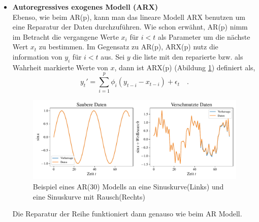 \begin{itemize}
\[\begin{matrix}
    \end{matrix}\right)
  \]
  und \[
  \phi=
    \left(\begin{matrix}
    \phi_{1}\\
    \phi_{2}\\
    \vdots\\
    \phi_{p-1}\\
    \phi_{p}
    \end{matrix}\right)
  \]
  Um eine Reparation der Werte durchzuführen, werden zuerst alle $x_t$ durch
  $y_t$ getauscht für alle markierte $x_t$. Sei $x^{truth}$ eine Liste von den
  markierten Werte in $x$, dann kann man diese Werte für das lernen der
  Parameter $\phi$ benutzen um eine genauere Vorhersage der Werte ohne
  Markierung $x\setminus x^{truth}$ vorzunehmen. Um mit AR eine Reparatur
  vornehmen zu können, vergleicht man den Abstand einer nicht markierten Wert
  $x_t$ zu $x_t'$ mit einem Schwellenwert $\tau$. Falls diese den Schwellenwert
  überschreitet, repariert man den gegebenen Wert mit der Vorhersage $x_t'$.
  Anderseits lässt man den alten Wert $x_t$ stehen. Also,
  \[
    y_t= 
    \begin{cases}
    x_t'& \text{falls} \,|x_t'-x_t|>\tau\\
    x_r              & \text{sonst}
    \end{cases}
  \]
    \item \textbf{Autoregressives exogenes Modell (ARX)}\\
    Ebenso, wie beim AR(p), kann man das lineare Modell ARX benutzen um eine
    Reparatur der Daten durchzuführen. Wie schon erwähnt, AR(p) nimm im
    Betracht die vergangene Werte $x_i$ für $i<t$ als Parameter um die nächste
    Wert $x_t$ zu bestimmen. Im Gegensatz zu AR(p), ARX(p) nutz die information
    von $y_i$ für $i<t$ aus. Sei $y$ die liste mit den reparierte bzw. als
    Wahrheit markierte Werte von $x$, dann ist ARX(p) (Abildung \ref{fig:arx})
    definiert als, 
    \[
      y_t'=\sum_{i=1}^{p}\phi_i(y_{t-i}-x_{t-i})+\epsilon_t\quad.
    \]
    \begin{figure}[h]
      \centering
      \includegraphics[width=\textwidth,keepaspectratio]{../plots/arx_sauber_verschmutze_daten.pdf}
      \caption{Beispiel eines AR(30) Modells an eine Sinuskurve(Links) und eine
      Sinuskurve mit Rausch(Rechts)}
      \label{fig:arx}
    \end{figure}
    Die Reparatur der Reihe funktioniert dann genauso wie beim AR Modell.
\end{itemize}
